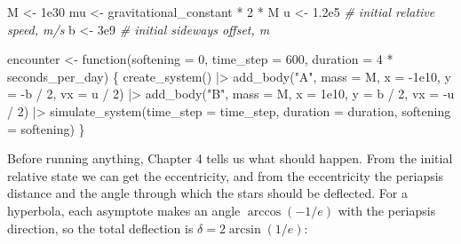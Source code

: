 \documentclass[
  10.5pt,
  letterpaper,
]{scrbook}
\newenvironment{Shaded}{\begin{snugshade}}{\end{snugshade}}
\newcommand{\AttributeTok}[1]{\textcolor[rgb]{0.00,0.00,0.00}{#1}}
\newcommand{\CommentTok}[1]{\textcolor[rgb]{0.00,0.00,0.00}{\textit{#1}}}
\newcommand{\ControlFlowTok}[1]{\textcolor[rgb]{0.00,0.00,0.00}{#1}}
\newcommand{\DecValTok}[1]{\textcolor[rgb]{0.00,0.00,0.00}{#1}}
\newcommand{\FloatTok}[1]{\textcolor[rgb]{0.00,0.00,0.00}{#1}}
\newcommand{\FunctionTok}[1]{\textcolor[rgb]{0.00,0.00,0.00}{#1}}
\newcommand{\NormalTok}[1]{\textcolor[rgb]{0.00,0.00,0.00}{#1}}
\newcommand{\OtherTok}[1]{\textcolor[rgb]{0.00,0.00,0.00}{#1}}
\newcommand{\SpecialCharTok}[1]{\textcolor[rgb]{0.00,0.00,0.00}{#1}}
\newcommand{\StringTok}[1]{\textcolor[rgb]{0.00,0.00,0.00}{#1}}
\theoremstyle{plain}
\theoremstyle{remark}
\begin{document}
\begin{Shaded}
\begin{Highlighting}[]
\NormalTok{M  }\OtherTok{\textless{}{-}} \FloatTok{1e30}
\NormalTok{mu }\OtherTok{\textless{}{-}}\NormalTok{ gravitational\_constant }\SpecialCharTok{*} \DecValTok{2} \SpecialCharTok{*}\NormalTok{ M}
\NormalTok{u  }\OtherTok{\textless{}{-}} \FloatTok{1.2e5}     \CommentTok{\# initial relative speed, m/s}
\NormalTok{b  }\OtherTok{\textless{}{-}} \FloatTok{3e9}       \CommentTok{\# initial sideways offset, m}

\NormalTok{encounter }\OtherTok{\textless{}{-}} \ControlFlowTok{function}\NormalTok{(}\AttributeTok{softening =} \DecValTok{0}\NormalTok{, }\AttributeTok{time\_step =} \DecValTok{600}\NormalTok{,}
                      \AttributeTok{duration =} \DecValTok{4} \SpecialCharTok{*}\NormalTok{ seconds\_per\_day) \{}
  \FunctionTok{create\_system}\NormalTok{() }\SpecialCharTok{|\textgreater{}}
    \FunctionTok{add\_body}\NormalTok{(}\StringTok{"A"}\NormalTok{, }\AttributeTok{mass =}\NormalTok{ M, }\AttributeTok{x =} \SpecialCharTok{{-}}\FloatTok{1e10}\NormalTok{, }\AttributeTok{y =} \SpecialCharTok{{-}}\NormalTok{b }\SpecialCharTok{/} \DecValTok{2}\NormalTok{, }\AttributeTok{vx =}\NormalTok{  u }\SpecialCharTok{/} \DecValTok{2}\NormalTok{) }\SpecialCharTok{|\textgreater{}}
    \FunctionTok{add\_body}\NormalTok{(}\StringTok{"B"}\NormalTok{, }\AttributeTok{mass =}\NormalTok{ M, }\AttributeTok{x =}  \FloatTok{1e10}\NormalTok{, }\AttributeTok{y =}\NormalTok{  b }\SpecialCharTok{/} \DecValTok{2}\NormalTok{, }\AttributeTok{vx =} \SpecialCharTok{{-}}\NormalTok{u }\SpecialCharTok{/} \DecValTok{2}\NormalTok{) }\SpecialCharTok{|\textgreater{}}
    \FunctionTok{simulate\_system}\NormalTok{(}\AttributeTok{time\_step =}\NormalTok{ time\_step, }\AttributeTok{duration =}\NormalTok{ duration,}
                    \AttributeTok{softening =}\NormalTok{ softening)}
\NormalTok{\}}
\end{Highlighting}
\end{Shaded}

Before running anything, Chapter 4 tells us what should happen. From the
initial relative state we can get the eccentricity, and from the
eccentricity the periapsis distance and the angle through which the
stars should be deflected. For a hyperbola, each asymptote makes an
angle \(\arccos(-1/e)\) with the periapsis direction, so the total
deflection is \(\delta = 2\arcsin(1/e)\):
\end{document}
